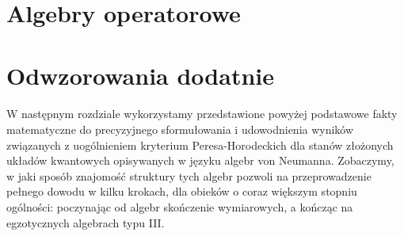 \section{Algebry operatorowe}

%
%

\section{Odwzorowania dodatnie}

%

\paragraph{}
W następnym rozdziale wykorzystamy przedstawione powyżej podstawowe fakty
matematyczne do precyzyjnego sformułowania i udowodnienia wyników związanych
z uogólnieniem kryterium Peresa-Horodeckich dla stanów złożonych układów
kwantowych opisywanych w języku algebr von Neumanna.
Zobaczymy,
w jaki sposób znajomość struktury tych algebr pozwoli na przeprowadzenie
pełnego dowodu w kilku krokach, dla obieków o coraz większym stopniu ogólności:
poczynając od algebr skończenie wymiarowych,
a kończąc na egzotycznych algebrach typu III.



